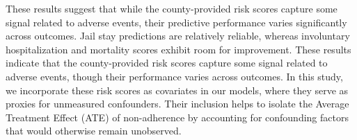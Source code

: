 These results suggest that while the county-provided risk scores capture some signal related to adverse events, their predictive performance varies significantly across outcomes.
Jail stay predictions are relatively reliable, whereas involuntary hospitalization and mortality scores exhibit room for improvement.
These results indicate that the county-provided risk scores capture some signal related to adverse events, though their performance varies across outcomes.
In this study, we incorporate these risk scores as covariates in our models, where they serve as proxies for unmeasured confounders.
Their inclusion helps to isolate the Average Treatment Effect (ATE) of non-adherence by accounting for confounding factors that would otherwise remain unobserved.



